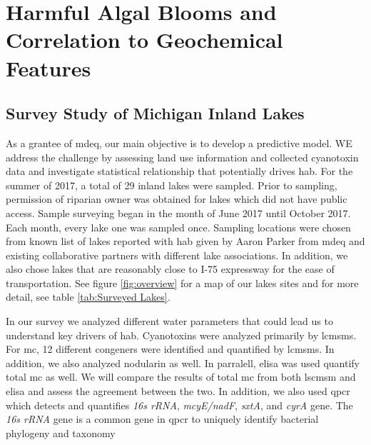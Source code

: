 \chapter{Harmful Algal Blooms and Correlation to Geochemical Features}

\section{Survey Study of Michigan Inland Lakes} 
As a grantee of \gls{mdeq}, our main objective is to develop a predictive model. WE address the challenge by assessing land use information and collected cyanotoxin data and investigate statistical relationship that potentially drives \gls{hab}. For the summer of 2017, a total of 29 inland lakes were sampled. Prior to sampling, permission of riparian owner was obtained for lakes which did not have public access. Sample surveying began in the month of June 2017 until October 2017. Each month, every lake one was sampled once. Sampling locations were chosen from known list of lakes reported with \gls{hab} given by Aaron Parker from \gls{mdeq} and existing collaborative partners with different lake associations. In addition, we also chose lakes that are reasonably close to I-75 expressway for the ease of transportation. See figure \ref{fig:overview} for a map of our lakes sites and for more detail, see table \ref{tab:Surveyed Lakes}.

In our survey we analyzed different water parameters that could lead us to understand key drivers of \gls{hab}. Cyanotoxins were analyzed primarily by \gls{lcmsms}. For \gls{mc}, 12 different congeners were identified and quantified by \gls{lcmsms}. In addition, we also analyzed nodularin as well. In parralell, \gls{elisa} was used quantify total \gls{mc} as well. We will compare the results of total \gls{mc} from both \gls{lscmsm} and \gls{elisa} and assess the agreement between the two. In addition, we also used \gls{qpcr} which detects and quantifies \emph{16s rRNA}, \emph{mcyE/nadF}, \emph{sxtA}, and \emph{cyrA} gene. The \emph{16s rRNA} gene is a common gene in \gls{qpcr} to uniquely identify bacterial phylogeny and taxonomy \cite{janda_} %


